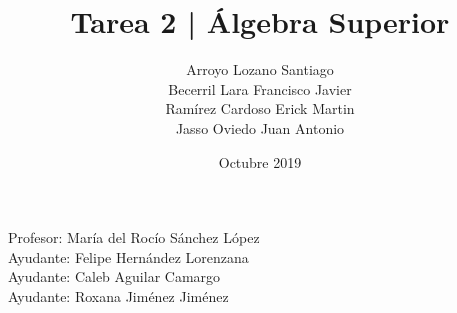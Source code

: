 \documentclass{article}
\title{Tarea 2 | Álgebra Superior}
\author{Arroyo Lozano Santiago \\ Becerril Lara Francisco Javier \\ Ramírez Cardoso Erick Martin \\ Jasso Oviedo Juan Antonio }
\date{Octubre 2019}
\begin{document}
\maketitle

\begin{center}
   Profesor:	María del Rocío Sánchez López \\
   Ayudante:	Felipe Hernández Lorenzana \\
   Ayudante:	Caleb Aguilar Camargo \\
   Ayudante:	Roxana Jiménez Jiménez \\
\end{center}
\end{document}
